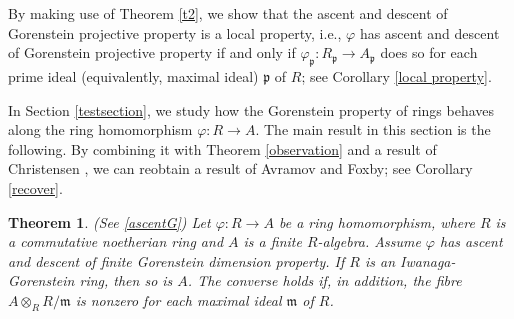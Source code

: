 \documentclass{amsart}
\newcommand{\0}{{\bf{0}}}
\newcommand{\m}{\mathfrak{m}}
\newcommand{\p}{\mathfrak{p}}
\DeclareMathOperator{\Hom}{Hom}
\newtheorem{theorem}{Theorem}[section]
\theoremstyle{definition}
\begin{document}
By making use of Theorem \ref{t2}, we show that the ascent and descent of Gorenstein projective property is a local property, i.e., $\varphi$ has ascent and descent of Gorenstein projective property if and only if $\varphi_\p\colon R_\p\rightarrow A_\p$ does so for each prime ideal (equivalently, maximal ideal) $\p$ of $R$; see Corollary \ref{local property}.



In Section \ref{testsection}, we study how the Gorenstein property of rings behaves along the ring homomorphism $\varphi\colon R\rightarrow A$. The main result in this section is the following. By combining it with Theorem \ref{observation} and a result of Christensen \cite[Proposition 8.3]{Chr01}, we can reobtain a result of Avramov and Foxby; see Corollary \ref{recover}.

\begin{theorem}\label{t3}(See \ref{ascentG})
Let $\varphi\colon R\rightarrow A$ be a ring homomorphism, where $R$ is a commutative noetherian ring and $A$ is a finite $R$-algebra. Assume $\varphi$ has ascent and descent of finite Gorenstein dimension property. If $R$ is an Iwanaga-Gorenstein ring, then so is $A$. The converse holds if, in addition, the fibre $A\otimes_R R/\m$ is nonzero for each maximal ideal $\m$ of $R$.
\end{theorem}



\end{document}

